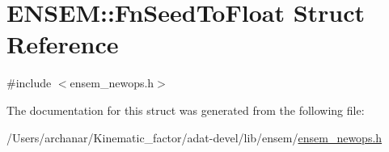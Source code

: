 \hypertarget{structENSEM_1_1FnSeedToFloat}{}\section{E\+N\+S\+EM\+:\+:Fn\+Seed\+To\+Float Struct Reference}
\label{structENSEM_1_1FnSeedToFloat}


{\ttfamily \#include $<$ensem\+\_\+newops.\+h$>$}



The documentation for this struct was generated from the following file\+:\begin{DoxyCompactItemize}
\item 
/\+Users/archanar/\+Kinematic\+\_\+factor/adat-\/devel/lib/ensem/\mbox{\hyperlink{adat-devel_2lib_2ensem_2ensem__newops_8h}{ensem\+\_\+newops.\+h}}\end{DoxyCompactItemize}
